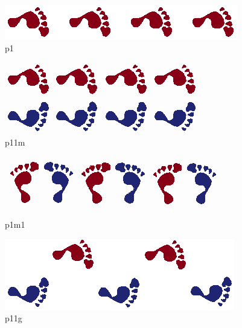 \documentclass[class=article, crop=false]{standalone}
\begin{document}
\begin{subfigure}{0.21\linewidth}
        \centering
		\includegraphics[width=\linewidth, angle=90]{Figures/Frieze groups/Frieze_hop.png}
		\caption{p1}
		\label{fig:p1}
	\end{subfigure}
	\begin{subfigure}{0.21\linewidth}
        \centering
		\includegraphics[width=\linewidth,angle=90]{Figures/Frieze groups/Frieze_jump.png}
		\caption{p11m}
		\label{fig:p11m}
	\end{subfigure}
	\begin{subfigure}{0.21\linewidth}
            \centering
	        \includegraphics[width=\linewidth,angle=90]{Figures/Frieze groups/Frieze_sidle.png}
	        \caption{p1m1}
	        \label{fig:p1m1}
    \end{subfigure}
    \begin{subfigure}{0.21\linewidth}
            \centering
	        \includegraphics[width=\linewidth,angle=90]{Figures/Frieze groups/Frieze_step.png}
	        \caption{p11g}
	        \label{fig:p11g}
    \end{subfigure}
\end{document}
